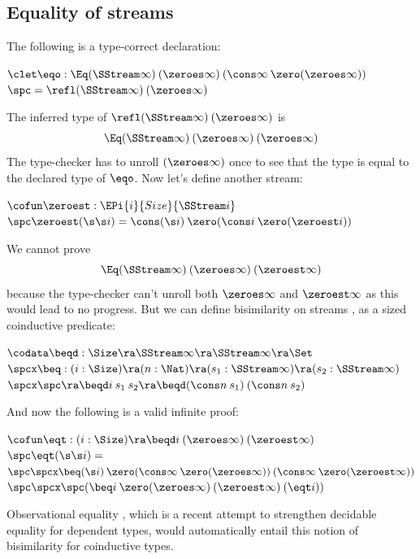 \subsection{Equality of streams}
\label{heq}
The following is a type-correct declaration:
\begin{bsp}
$\clet \eqo : \Eq (\SStream \infty) \: (\zeroes \infty) \: (\cons \infty \: \zero (\zeroes \infty))$\\
$\spc = \refl (\SStream \infty) \: (\zeroes \infty)$
\end{bsp}
The inferred type of $\refl (\SStream \infty) \: (\zeroes \infty)$ is 
\[\Eq (\SStream \infty) \: (\zeroes \infty) \: (\zeroes \infty)\]
The type-checker has to unroll $(\zeroes \infty)$ once to see that the type is equal to the declared type of $\eqo$.
Now let's define another stream:
\begin{bsp}
$\cofun \zeroest: \EPi{i}{Size}{\SStream i} $ \\
$\spc \zeroest (\s \s i) = \cons (\s i) \: \zero (\cons i \: \zero (\zeroest i))$
\end{bsp}
We cannot prove \[\Eq (\SStream \infty) \: (\zeroes \infty) \: (\zeroest \infty)\]
because the type-checker can't unroll both $\zeroes \infty$ and $\zeroest \infty$ as
this would lead to no progress.
But we can define bisimilarity on streams \cite{coquand-infinite}, as a sized coinductive predicate:
\begin{bsp}
$\codata \beqd : \Size \ra \SStream \infty \ra \SStream \infty \ra \Set$\\
$ \spcx \beq : (i : \Size ) \ra ( n : \Nat ) \ra (s_1 : \SStream \infty ) \ra (s_2 : \SStream \infty )$\\
$ \spcx \spc  \ra \beqd i \: s_1 \: s_2 \ra \beqd (\cons n \: s_1) \: (\cons n \: s_2)$
\end{bsp}
\noindent And now the following is a valid infinite proof:
\begin{bsp}
$\cofun \eqt : (i : \Size ) \ra \beqd i \: (\zeroes \infty) \: (\zeroest \infty)$\\
$\spc \eqt (\s \s i) = $\\
$\spc \spcx \beq (\s i) \: \zero (\cons \infty \: \zero (\zeroes \infty)) \: (\cons \infty \: \zero (\zeroest \infty))$\\ 
$\spc \spcx \spc (\beq i \: \zero (\zeroes \infty) \: (\zeroest \infty) \: (\eqt i))$
\end{bsp}
Observational equality \cite{conf/plpv/AltenkirchMS07}, which is a recent attempt to strengthen decidable equality for dependent types, would automatically entail this notion of bisimilarity for coinductive types.

